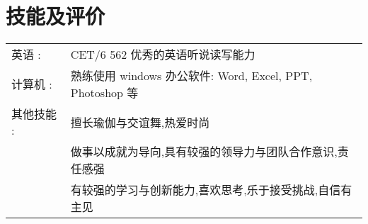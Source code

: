 \documentclass[a4paper]{article} %
\begin{document}
\section{技能及评价}

\begin{tabular}{ll}

英语 :
 &CET/6 562 \hspace{2em}  优秀的英语听说读写能力\\

 计算机 :
 &熟练使用 windows 办公软件: Word, Excel, PPT, Photoshop 等\\

 其他技能 :
 &擅长瑜伽与交谊舞,热爱时尚\\
 &做事以成就为导向,具有较强的领导力与团队合作意识,责任感强\\
 &有较强的学习与创新能力,喜欢思考,乐于接受挑战,自信有主见\\


\end{tabular}
\end{document}
